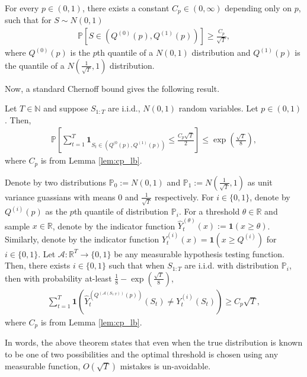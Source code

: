 \begin{lemma}
    For every $p \in (0,1)$, there exists a constant $C_p \in (0,\infty)$ depending only on $p$, such that for $S \sim {N}(0,1)$
    \begin{align*}
        \mathbb{P}[S \in (Q^{(0)}(p), Q^{(1)}(p))] \geq \frac{C_p}{\sqrt{T}},
    \end{align*}
    where $Q^{(0)}(p)$ is the $p$th quantile of a $N(0,1)$ distribution and $Q^{(1)}(p)$ is the quantile of a $N(\frac{1}{\sqrt{T}},1)$ distribution.
    \label{lem:cp_lb}
\end{lemma}

Now, a standard Chernoff bound gives the following result.
\begin{lemma}
Let $T \in \mathbb{N}$ and suppose $S_{1:T}$ are i.i.d., $N(0,1)$ random variables. Let $p \in (0,1)$. Then, 
\begin{align}
    \mathbb{P}\left[ \sum_{t=1}^T \mathbf{1}_{S_t \in (Q^{(0}(p), Q^{(1)}(p))} \leq \frac{C_p\sqrt{T}}{2} \right] \leq \exp \left( \frac{\sqrt{T}}{8} \right),
\end{align}
where $C_p$ is from Lemma \ref{lem:cp_lb}.
    \label{lem:lb_chernoff}
\end{lemma}

\begin{theorem}
Denote by two distributions  $\mathbb{P}_0 := N(0,1)$ and $\mathbb{P}_{1} := N(\frac{1}{\sqrt{T}},1)$ as unit variance guassians with means $0$ and $\frac{1}{\sqrt{T}}$ respectively. For $i \in \{0,1\}$, denote by $Q^{(i)}(p)$ as the $p$th quantile of distribution $\mathbb{P}_i$. For a threshold $\theta \in \mathbb{R}$ and sample $x \in \mathbb{R}$, denote by the indicator function $\widehat{Y}_t^{(\theta)}(x) := \mathbf{1}(x \geq \theta)$. Similarly, denote by the indicator function $Y_t^{(i)}(x) = \mathbf{1}(x \geq Q^{(i)})$ for $i \in \{0,1\}$. Let $\mathcal{A}: \mathbb{R}^T \to \{0,1\}$ be any measurable hypothesis testing function. Then, there exists $i \in \{0,1\}$ such that when $S_{1:T}$ are i.i.d. with distribution $\mathbb{P}_i$, then with probability at-least $\frac{1}{8} -  \exp \left( \frac{\sqrt{T}}{8} \right)$,
    \begin{align*}
 \sum_{t=1}^T \mathbf{1} ( \widehat{Y}_t^{(Q^{(\mathcal{A}(S_{1:T}))}(p))}(S_t) \neq Y_t^{(i)}(S_t) ) \geq C_p \sqrt{T},
    \end{align*}
where $C_p$ is from Lemma \ref{lem:cp_lb}.
    \label{thm:main_lower_bound}
\end{theorem}
In words, the above theorem states that even when the true distribution is known to be one of two possibilities and the optimal threshold is chosen using any measurable function, $O(\sqrt{T})$ mistakes is un-avoidable. 

